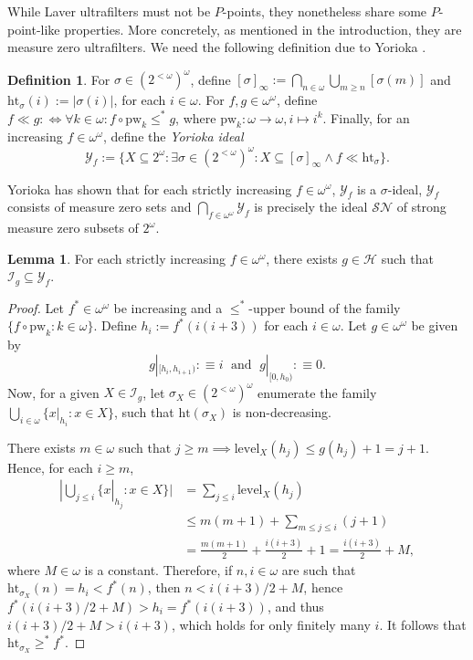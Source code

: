 \documentclass[12pt]{article}
\theoremstyle{definition}
\newtheorem{lem}[nummer]{\sc Lemma}
\newtheorem{defi}[nummer]{\sc Definition}
\newcommand\level{\text{level}}
\begin{document}
While Laver ultrafilters must not be $P$-points, they nonetheless share some $P$-point-like properties. More concretely, as mentioned in the introduction, they are measure zero ultrafilters. We need the following definition due to Yorioka \cite{yoriokaideals}.

\begin{defi}
For $\sigma \in (2^{<\omega})^{\omega}$,	 define $[\sigma]_{\infty}:=\bigcap_{n \in \omega}\bigcup_{m \geq n}[\sigma(m)]$ and $\text{ht}_{\sigma}(i):=|\sigma(i)|$, for each $i \in \omega$. For $f,g \in \omega^\omega$, define $f \ll g :\iff \forall k \in \omega: f \circ \text{pw}_k \leq^{\ast}g$, where $\text{pw}_k: \omega \to \omega, i \mapsto i^k$. Finally, for an increasing $f \in \omega^\omega$, define the \textit{Yorioka ideal}
\[\mathcal{Y}_f:=\{X \subseteq 2^{\omega}: \exists \sigma \in (2^{<\omega})^{\omega}: X \subseteq [\sigma]_{\infty} \land f \ll \text{ht}_{\sigma}\}.\]
\end{defi}

Yorioka \cite{yoriokaideals} has shown that for each strictly increasing $f \in \omega^\omega$, $\mathcal{Y}_f$ is a $\sigma$-ideal, $\mathcal{Y}_f$ consists of measure zero sets and $\bigcap_{f\in \omega^\omega}\mathcal{Y}_f$ is precisely the ideal $\mathcal{SN}$ of strong measure zero subsets of $2^\omega$.

\begin{lem}\label{lemyor}
For each strictly increasing $f \in \omega^\omega$, there exists $g\in\mathcal{H}$ such that $\mathcal{I}_g \subseteq \mathcal{Y}_f$.
\end{lem}

\begin{proof}
	Let $f^{\ast}\in \omega^\omega$ be increasing and a $\leq^{\ast}$-upper bound of the family $\{f \circ \text{pw}_k: k \in \omega\}$. Define $h_i:=f^{\ast}(i(i+3))$ for each $i \in \omega$. Let $g \in \omega^\omega$ be given by 
	\[g|_{[h_i, h_{i+1})}:\equiv i \;\text{ and }\; g|_{[0,h_0)}:\equiv 0.\]
	Now, for a given $X \in \mathcal{I}_g$, let $\sigma_X \in (2^{<\omega})^\omega$ enumerate the family $\bigcup_{i \in \omega}\{x|_{h_i}: x \in X\}$, such that $\text{ht}(\sigma_X)$ is non-decreasing.
	
	There exists $m \in \omega$ such that $j \geq m \implies \level_X(h_j) \leq g(h_j)+1=j+1$. Hence, for each $i \geq m$,
	\[\begin{aligned}|\bigcup_{j \leq i} \{x|_{h_j}: x \in X\}|&=\sum_{j \leq i} \level_X(h_j)\\
	&\leq m (m+1)+ \sum_{m \leq j \leq i}(j+1)\\
	&=\frac{m(m+1)}{2}+\frac{i(i+3)}{2}+1=\frac{i(i+3)}{2}+M,\end{aligned}\]
where $M \in \omega$ is a constant. Therefore, if $n,i \in \omega$ are such that $\text{ht}_{\sigma_X}(n)=h_i< f^{\ast}(n)$, then $n < i(i+3)/2 + M$, hence $f^{\ast}(i(i+3)/2 + M)> h_i = f^{\ast}(i(i+3))$, and thus $i(i+3)/2 +M > i(i+3)$, which holds for only finitely many $i$. It follows that $\text{ht}_{\sigma_X}\geq^{\ast}f^{\ast}$.
\end{proof}
\end{document}
